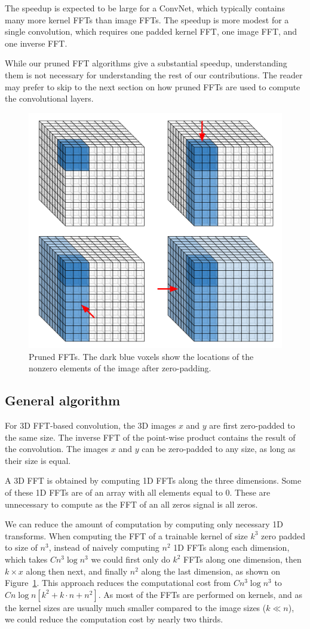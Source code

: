 \documentclass[conference]{./IEEEtran/IEEEtran}
\begin{document}
  The speedup is expected to be large for a ConvNet, which typically
  contains many more kernel FFTs than image FFTs.  The speedup is more
  modest for a single convolution, which requires one padded kernel
  FFT, one image FFT, and one inverse FFT.

  While our pruned FFT algorithms give a substantial speedup,
  understanding them is not necessary for understanding the rest of
  our contributions.  The reader may prefer to skip to the next
  section on how pruned FFTs are used to compute the convolutional
  layers.

  \begin{figure}
    \begin{center}
      \includegraphics[width=0.55\columnwidth]{fig/pruned_ffts.pdf}
    \end{center}
    \caption{Pruned FFTs. The dark blue voxels show the locations of the nonzero elements of the image after zero-padding. }
    \label{fig:pruned_ffts}
  \end{figure}

\subsection{General algorithm}
  For 3D FFT-based convolution, the 3D images $x$ and $y$ are first
  zero-padded to the same size.  The inverse FFT of the point-wise
  product contains the result of the convolution.  The images $x$ and
  $y$ can be zero-padded to any size, as long as their size is equal.

  A 3D FFT is obtained by computing 1D FFTs along the three
  dimensions.  Some of these 1D FFTs are of an array with all elements
  equal to $0$.  These are unnecessary to compute as the FFT of
  an all zeros signal is all zeros.

  We can reduce the amount of computation by computing only necessary
  1D transforms.  When computing the FFT of a trainable kernel of size
  $k^3$ zero padded to size of $n^3$, instead of naively computing
  $n^2$ 1D FFTs along each dimension, which takes $C n^3 \log n^3$ we
  could first only do $k^2$ FFTs along one dimension, then $k \times
  x$ along then next, and finally $n^2$ along the last dimension, as
  shown on Figure~\ref{fig:pruned_ffts}.  This approach reduces the
  computational cost from $C n^3 \log n^3$ to $C n\log n[k^2 + k \cdot
  n + n^2]$.  As most of the FFTs are performed on kernels, and as the
  kernel sizes are usually much smaller compared to the image sizes
  ($k \ll n$), we could reduce the computation cost by nearly two
  thirds.
\end{document}
